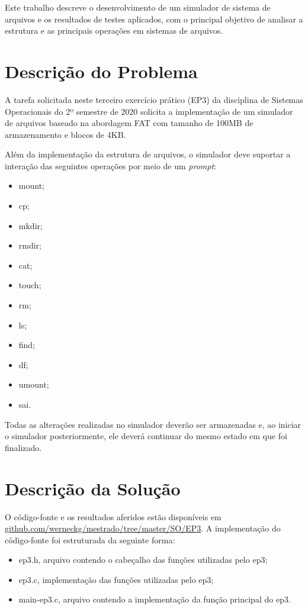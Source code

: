 \documentclass[12pt]{article}
\begin{document}
Este trabalho descreve o desenvolvimento de um simulador de sistema de arquivos e os resultados de testes aplicados, com o principal objetivo de analisar a estrutura e as principais operações em sistemas de arquivos.

\section{Descrição do Problema} \label{sec:firstpage}

A tarefa solicitada neste terceiro exercício prático (EP3) da disciplina de Sistemas Operacionais do 2º semestre de 2020 solicita a implementação de um simulador de arquivos baseado na abordagem FAT com tamanho de 100MB de armazenamento e blocos de 4KB.

Além da implementação da estrutura de arquivos, o simulador deve suportar a interação das seguintes operações por meio de um \textit{prompt}:

\begin{itemize}
	\item mount;
	\item cp;
	\item mkdir;
	\item rmdir;
	\item cat;
	\item touch;
	\item rm;
	\item ls;
	\item find;
	\item df;
	\item umount;
	\item sai.
\end{itemize}

Todas as alterações realizadas no simulador deverão ser armazenadas e, ao iniciar o simulador posteriormente, ele deverá continuar do mesmo estado em que foi finalizado.

\section{Descrição da Solução}

O código-fonte e os resultados aferidos estão disponíveis em \url{github.com/werneckg/mestrado/tree/master/SO/EP3}. A implementação do código-fonte foi estruturada da seguinte forma:
\begin{itemize}
	\item ep3.h, arquivo contendo o cabeçalho das funções utilizadas pelo ep3;
	\item ep3.c, implementação das funções utilizadas pelo ep3;
	\item main-ep3.c, arquivo contendo a implementação da função principal do ep3.
\end{itemize}
\end{document}
